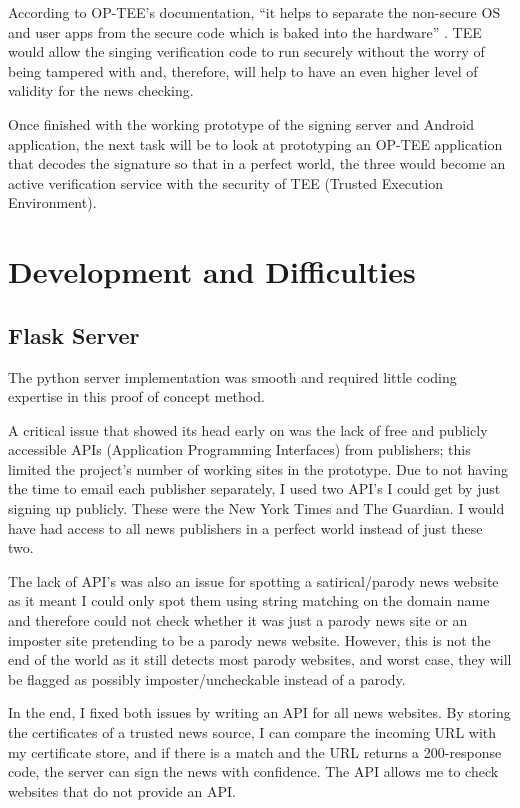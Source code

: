 \documentclass[11pt,a4paper]{report}
\begin{document}
According to OP-TEE’s documentation, “it helps to separate the non-secure OS and user apps from the secure code which is baked into the hardware” \citep{OP-TEE}. TEE would allow the singing verification code to run securely without the worry of being tampered with and, therefore, will help to have an even higher level of validity for the news checking.

Once finished with the working prototype of the signing server and Android application, the next task will be to look at prototyping an OP-TEE application that decodes the signature so that in a perfect world, the three would become an active verification service with the security of TEE (Trusted Execution Environment).
\newpage
\section{Development and Difficulties}
\subsection{Flask Server}
The python server implementation was smooth and required little coding expertise in this proof of concept method.

A critical issue that showed its head early on was the lack of free and publicly accessible APIs (Application Programming Interfaces) from publishers; this limited the project’s number of working sites in the prototype. Due to not having the time to email each publisher separately, I used two API’s I could get by just signing up publicly. These were the New York Times and The Guardian. I would have had access to all news publishers in a perfect world instead of just these two.

The lack of API’s was also an issue for spotting a satirical/parody news website as it meant I could only spot them using string matching on the domain name and therefore could not check whether it was just a parody news site or an imposter site pretending to be a parody news website. However, this is not the end of the world as it still detects most parody websites, and worst case, they will be flagged as possibly imposter/uncheckable instead of a parody.

In the end, I fixed both issues by writing an API for all news websites. By storing the certificates of a trusted news source, I can compare the incoming URL with my certificate store, and if there is a match and the URL returns a 200-response code, the server can sign the news with confidence. The API allows me to check websites that do not provide an API.
\end{document}
